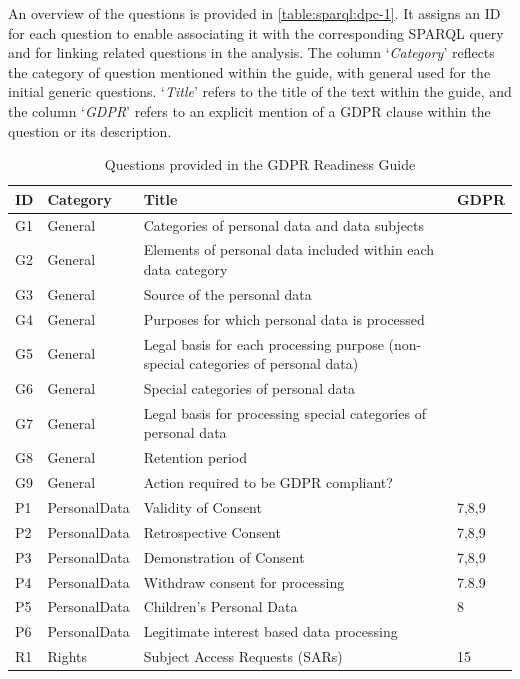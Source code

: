 An overview of the questions is provided in \autoref{table:sparql:dpc-1}.
It assigns an ID for each question to enable associating it with the corresponding SPARQL query and for linking related questions in the analysis.
The column `\textit{Category}' reflects the category of question mentioned within the guide, with general used for the initial generic questions.
`\textit{Title}' refers to the title of the text within the guide, and the column `\textit{GDPR}' refers to an explicit mention of a GDPR clause within the question or its description.
\begin{table}[htbp]
\footnotesize
\centering
\caption{Questions provided in the GDPR Readiness Guide}
\begin{tabularx}{\textwidth}{|l|l|X|l|}
\hline
ID & Category & Title & GDPR \\ \hline
G1 & General & Categories of personal data and data subjects &  \\ \hline
G2 & General & Elements of personal data included within each data category &  \\ \hline
G3 & General & Source of the personal data &  \\ \hline
G4 & General & Purposes for which personal data is processed &  \\ \hline
G5 & General & Legal basis for each processing purpose (non-special categories of personal data) &  \\ \hline
G6 & General & Special categories of personal data &  \\ \hline
G7 & General & Legal basis for processing special categories of personal data &  \\ \hline
G8 & General & Retention period &  \\ \hline
G9 & General & Action required to be GDPR compliant? &  \\ \hline
P1 & PersonalData & Validity of Consent & 7,8,9 \\ \hline
P2 & PersonalData & Retrospective Consent & 7,8,9 \\ \hline
P3 & PersonalData & Demonstration of Consent & 7,8,9 \\ \hline
P4 & PersonalData & Withdraw consent for processing & 7.8.9 \\ \hline
P5 & PersonalData & Children's Personal Data & 8 \\ \hline
P6 & PersonalData & Legitimate interest based data processing &  \\ \hline
R1 & Rights & Subject Access Requests (SARs) & 15 \\ \hline

\end{tabularx}
\end{table}
